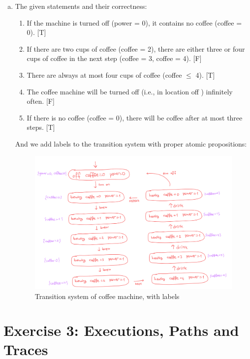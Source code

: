 \documentclass{article}
\begin{document}
\begin{enumerate}[(a)]
    \item The given statements and their correctness:
    \begin{enumerate}[i]
        \item If the machine is turned off (power = 0), it contains no coffee (coffee = 0). [T]
        \item If there are two cups of coffee (coffee = 2), there are either three or four cups of coffee in the next step (coffee = 3, coffee = 4). [F]
        \item There are always at most four cups of coffee (coffee $\leq $ 4). [T]
        \item The coffee machine will be turned off (i.e., in location off ) infinitely often. [F]
        \item If there is no coffee (coffee = 0), there will be coffee after at most three steps. [T]
    \end{enumerate}
    And we add labels to the transition system with proper atomic propositions:\\
    \begin{figure}[H]
        \centering
        \includegraphics[width=5in]{images/2b.png}
        \caption{Transition system of coffee machine, with labels}
        \label{fig:2b}
    \end{figure}
\end{enumerate}

\newpage

\section*{Exercise 3: Executions, Paths and Traces}
\end{document}
